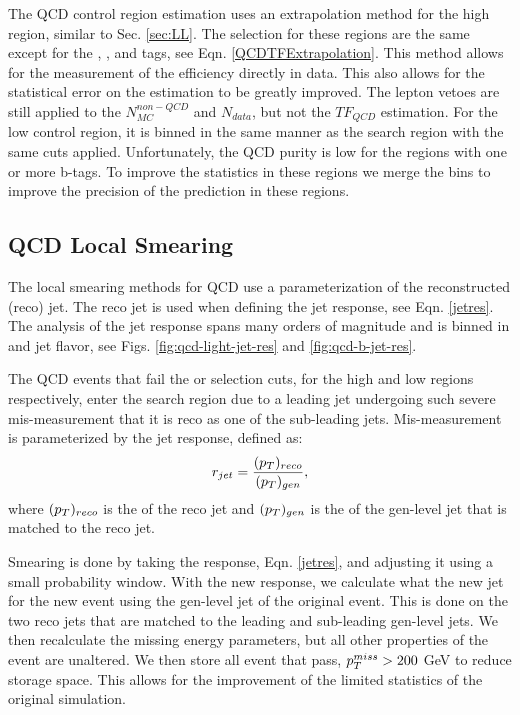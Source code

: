 The QCD control region estimation uses an extrapolation method for the high \dm{} region, similar to Sec. \ref{sec:LL}. The selection for these regions are the same except for the \nt, \nrt, and \nw{} tags, see Eqn. \ref{QCDTFExtrapolation}. This method allows for the measurement of the efficiency directly in data. This also allows for the statistical error on the estimation to be greatly improved. The lepton vetoes are still applied to the $N_{MC}^{non-QCD}$ and $N_{data}$, but not the $TF_{QCD}$ estimation. For the low \dm{} control region, it is binned in the same manner as the search region with the same cuts applied. Unfortunately, the QCD purity is low for the regions with one or more b-tags. To improve the statistics in these regions we merge the \met{} bins to improve the precision of the prediction in these regions. 

\subsection{QCD Local Smearing}\label{Smearing}

The local smearing methods for QCD use a parameterization of the reconstructed (reco) jet. The reco jet is used when defining the jet response, see Eqn. \ref{jetres}. The analysis of the jet response spans many orders of magnitude and is binned in \pt{} and jet flavor, see Figs. \ref{fig:qcd-light-jet-res} and \ref{fig:qcd-b-jet-res}. 

The QCD events that fail the \highdm{} or \lowdm{} selection cuts, for the high and low \dm{} regions respectively, enter the search region due to a leading jet undergoing such severe mis-measurement that it is reco as one of the sub-leading jets. Mis-measurement is parameterized by the jet response, defined as:
\begin{equation}\label{jetres}
r_{jet}=\frac{(p_{T})_{reco}}{(p_{T})_{gen}},
\end{equation}
where $(p_{T})_{reco}$ is the \pt{} of the reco jet and $(p_{T})_{gen}$ is the \pt{} of the gen-level jet that is matched to the reco jet.

Smearing is done by taking the response, Eqn. \ref{jetres}, and adjusting it using a small probability window. With the new response, we calculate what the new jet \pt{} for the new event using the gen-level jet \pt{} of the original event. This is done on the two reco jets that are matched to the leading and sub-leading gen-level jets. We then recalculate the missing energy parameters, but all other properties of the event are unaltered. We then store all event that pass, $p_{T}^{miss}>200$ GeV to reduce storage space. This allows for the improvement of the limited statistics of the original simulation. 

